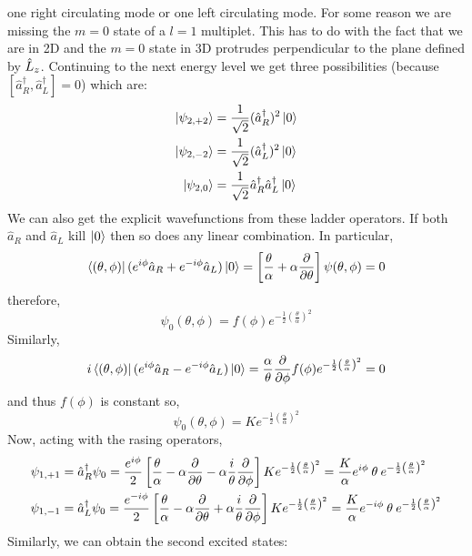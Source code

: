 \documentclass[12pt]{extarticle}
\begin{document}
one right circulating mode or one left circulating mode. For some reason we are missing the $m = 0$ state of a $l = 1$ multiplet. This has to do with the fact that we are in 2D and the $m = 0$ state in 3D protrudes perpendicular to the plane defined by $\hat{L}_z$. Continuing to the next energy level we get three possibilities (because $[\hat{a}^\dagger_R, \hat{a}^\dagger_L] = 0$) which are:
\begin{align*}
\left| \psi_{2, +2} \right> &= \frac{1}{\sqrt{2}} (\hat{a}^\dagger_R)^2 \left| 0 \right> \\
\left| \psi_{2, -2} \right> &= \frac{1}{\sqrt{2}} (\hat{a}^\dagger_L)^2 \left| 0 \right> \\
\left| \psi_{2, 0} \right> &= \frac{1}{\sqrt{2}} \hat{a}^\dagger_R \hat{a}^\dagger_L \left| 0 \right> 
\end{align*} 
We can also get the explicit wavefunctions from these ladder operators. If both $\hat{a}_R$ and $\hat{a}_L$ kill $\left| 0 \right>$ then so does any linear combination. In particular,
\[\left< (\theta, \phi) \right| (e^{i \phi} \hat{a}_R + e^{-i \phi} \hat{a}_L) \left| 0 \right> = \left[ \frac{\theta}{\alpha} + \alpha \frac{\partial{}}{\partial{\theta}} \right] \psi(\theta, \phi) = 0 \]
therefore,
\[\psi_0(\theta, \phi) = f(\phi) e^{-\frac{1}{2} \left(\frac{\theta}{\alpha} \right)^2}\]
Similarly, 
\[ i \left< (\theta, \phi) \right| (e^{i \phi} \hat{a}_R - e^{-i \phi} \hat{a}_L) \left| 0 \right> = \frac{\alpha}{\theta} \frac{\partial{}}{\partial{\phi}} f(\phi) e^{-\frac{1}{2} \left(\frac{\theta}{\alpha} \right)^2} = 0 \]
and thus $f(\phi)$ is constant so,
\[\psi_0(\theta, \phi) = K e^{-\frac{1}{2} \left(\frac{\theta}{\alpha} \right)^2}\]
Now, acting with the rasing operators, 
\begin{align*}
\psi_{1, +1} &= \hat{a}^\dagger_R \psi_0 = \frac{e^{i \phi}}{2} \left[\frac{\theta}{\alpha}  - \alpha \frac{\partial{}}{\partial{\theta}} - \alpha \frac{i}{\theta} \frac{\partial{}}{\partial{\phi}}  \right] K e^{-\frac{1}{2} \left(\frac{\theta}{\alpha} \right)^2}  = \frac{K}{\alpha} e^{i \phi} \: \theta \: e^{-\frac{1}{2} \left(\frac{\theta}{\alpha} \right)^2} \\
\psi_{1, -1} &= \hat{a}^\dagger_L \psi_0 = \frac{e^{-i \phi}}{2} \left[\frac{\theta}{\alpha}  - \alpha \frac{\partial{}}{\partial{\theta}} + \alpha \frac{i}{\theta} \frac{\partial{}}{\partial{\phi}}  \right] K e^{-\frac{1}{2} \left(\frac{\theta}{\alpha} \right)^2} = \frac{K}{\alpha} e^{-i \phi} \: \theta \: e^{-\frac{1}{2} \left(\frac{\theta}{\alpha} \right)^2}
\end{align*}
Similarly, we can obtain the second excited states:
\end{document}
